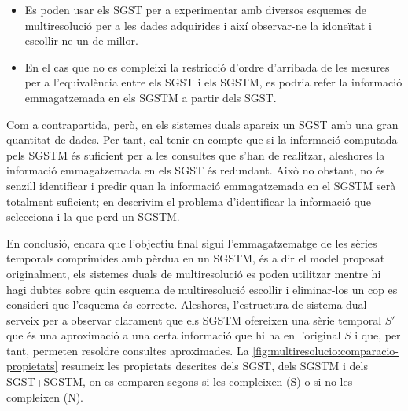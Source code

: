 \begin{itemize}
\item Es poden usar els \gls{SGST} per a experimentar amb diversos
  esquemes de multiresolució per a les dades adquirides i així
  observar-ne la idoneïtat i escollir-ne un de millor.

\item En el cas que no es compleixi la restricció d'ordre d'arribada
  de les mesures per a l'equivalència entre els \gls{SGST} i els
  \gls{SGSTM}, es podria refer la informació emmagatzemada en els
  \gls{SGSTM} a partir dels \gls{SGST}.

\end{itemize}


Com a contrapartida, però, en els sistemes duals apareix un \gls{SGST}
amb una gran quantitat de dades. Per tant, cal tenir en compte que si
la informació computada pels \gls{SGSTM} és suficient per a les
consultes que s'han de realitzar, aleshores la informació
emmagatzemada en els \gls{SGST} és redundant. Això no obstant, no és
senzill identificar i predir quan la informació emmagatzemada en el
\gls{SGSTM} serà totalment suficient; en
 descrivim el problema
d'identificar la informació que selecciona i la que perd un
\gls{SGSTM}.


En conclusió, encara que l'objectiu final sigui l'emmagatzematge de
les sèries temporals comprimides amb pèrdua en un \gls{SGSTM}, és a
dir el model proposat originalment, els sistemes duals de
multiresolució es poden utilitzar mentre hi hagi dubtes sobre quin
esquema de multiresolució escollir i eliminar-los un cop es consideri
que l'esquema és correcte. Aleshores, l'estructura de sistema dual
serveix per a observar clarament que els \gls{SGSTM} ofereixen una
sèrie temporal $S'$ que és una aproximació a una certa informació que
hi ha en l'original $S$ i que, per tant, permeten resoldre consultes
aproximades. %
La \autoref{fig:multiresolucio:comparacio-propietats} resumeix les
propietats descrites dels \gls{SGST}, dels \gls{SGSTM} i dels
\gls{SGST}+\gls{SGSTM}, on es comparen segons si les compleixen (S) o
si no les compleixen (N).


